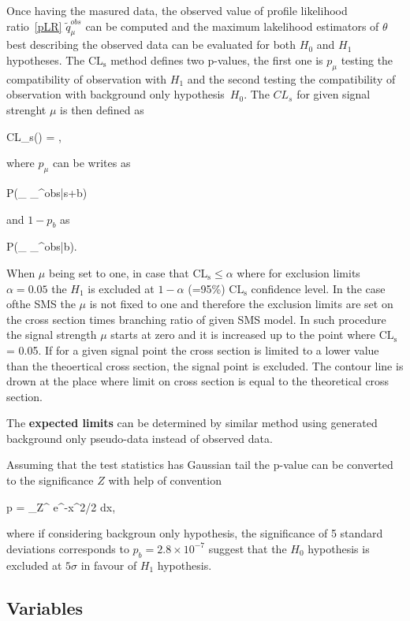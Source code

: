 Once having the masured data, the observed value of profile likelihood ratio~\ref{pLR} $\tilde{q}_{\mu}^{obs}$ can be computed and the maximum lakelihood estimators of $\theta$ best describing the observed data can be evaluated for both $H_{0}$ and $H_{1}$ hypotheses. The $\mathrm{CL_{s}}$  method defines two p-values, the first one is $p_{\mu}$ testing the compatibility of observation with $H_{1}$ and the second testing the compatibility of observation with background only hypothesis~$H_{0}$. The $CL_{s}$ for given signal strenght $\mu$ is then defined as

{
CL_{s}(\mu) = ,
}

where $p_{\mu}$ can be writes as

{
P(_{\mu} \geq {}_{\mu}^{obs}|s+b)
}

and $1-p_{b}$ as

{
P(_{\mu} \geq {}_{\mu}^{obs}|b).
}

When $\mu$ being set to one, in case that $\mathrm{CL_{s}} \leq \alpha$ where for exclusion limits $\alpha = 0.05$ the $H_{1}$ is excluded at $1-\alpha$ (=95\%) $\mathrm{CL_{s}}$ confidence level. In the case ofthe  SMS the $\mu$ is not fixed to one and therefore the exclusion limits are set on the cross section times branching ratio of given SMS model. In such procedure the signal strength $\mu$ starts at zero and it is increased up to the point where $\mathrm{CL_{s}}$ = 0.05. If for a given signal point the cross section is limited to a lower value than the theoertical cross section, the signal point is excluded. The contour line is drown at the place where limit on cross section is equal to the theoretical cross section.

The \textbf{expected limits} can be determined by similar method using generated background only pseudo-data instead of observed data. 

Assuming that the test statistics has Gaussian tail  the p-value can be converted to the significance $Z$ with help of convention

{
 p = \int_Z^{\infty}  e^{-x^{2}/2} dx,
}

where if considering backgroun only hypothesis, the significance of 5 standard deviations corresponds to $p_{b} = 2.8 \times 10^{-7} $ suggest that the $H_{0}$ hypothesis is excluded at $5 \sigma$ in favour of $H_{1}$ hypothesis. %

\subsection{Variables~\label{sec:variables}}

